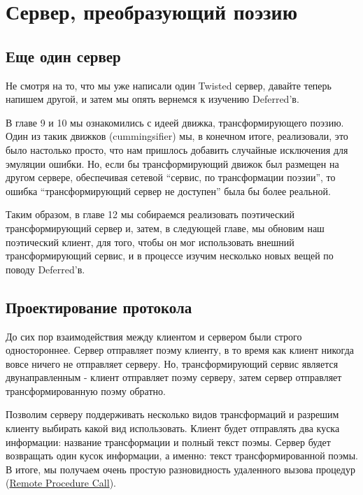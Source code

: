 
\section{Сервер, преобразующий поэзию\label{sec:part12}}

\subsection{Еще один сервер}

Не смотря на то, что мы уже написали один Twisted сервер, давайте теперь 
напишем другой, и затем мы опять вернемся к изучению Deferred'в.


В главе 9 и 10 мы ознакомились с идеей движка, трансформирующего поэзию. 
Один из такик движков (cummingsifier) мы, в конечном итоге, реализовали, это 
было настолько просто, что нам пришлось добавить случайные исключения для 
эмуляции ошибки. Но, если бы трансформирующий движок был размещен на 
другом сервере, обеспечивая сетевой ``сервис, по трансформации поэзии'', то 
ошибка ``трансформирующий сервер не доступен'' была бы более реальной.  


Таким образом, в главе 12 мы собираемся реализовать 
поэтический трансформирующий сервер и, затем, в следующей главе, 
мы обновим наш поэтический клиент, для того, чтобы он 
мог использовать внешний трансформирующий сервис, и в процессе  
изучим несколько новых вещей по поводу Deferred'в.


\subsection{Проектирование протокола}


До сих пор взаимодействия между клиентом и сервером были строго 
одностороннее. Сервер отправляет поэму клиенту, в то время как 
клиент никогда вовсе ничего не отправляет серверу. Но, трансформирующий 
сервис является двунаправленным - клиент отправляет поэму серверу, 
затем сервер отправляет трансформированную поэму обратно.


Позволим серверу поддерживать несколько видов трансформаций и 
разрешим клиенту выбирать какой вид использовать. Клиент 
будет отправлять два куска информации: название трансформации и 
полный текст поэмы. Сервер будет возвращать один кусок информации, 
а именно: текст трансформированной поэмы. В итоге, мы получаем 
очень простую разновидность удаленного вызова процедур (\href{http://en.wikipedia.org/wiki/Remote\_procedure\_call}{Remote Procedure Call}). 


